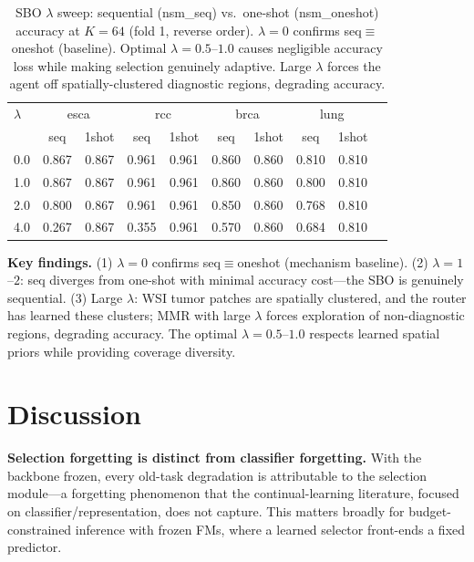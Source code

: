 \documentclass[runningheads]{llncs}
\begin{document}
\begin{table}[htbp]
\centering
\caption{SBO $\lambda$ sweep: sequential (nsm\_seq) vs.\ one-shot
(nsm\_oneshot) accuracy at $K{=}64$ (fold 1, reverse order).
$\lambda{=}0$ confirms seq$\equiv$oneshot (baseline). Optimal
$\lambda{=}0.5$--$1.0$ causes negligible accuracy loss while making
selection genuinely adaptive. Large $\lambda$ forces the agent off
spatially-clustered diagnostic regions, degrading accuracy.}
\label{tab:lambda}
\small\begin{tabular}{lccccccccc}
\toprule
$\lambda$ & \multicolumn{2}{c}{esca} & \multicolumn{2}{c}{rcc} & \multicolumn{2}{c}{brca} & \multicolumn{2}{c}{lung} \\
 & seq & 1shot & seq & 1shot & seq & 1shot & seq & 1shot \\
\midrule
0.0 & 0.867 & 0.867 & 0.961 & 0.961 & 0.860 & 0.860 & 0.810 & 0.810 \\
1.0 & 0.867 & 0.867 & 0.961 & 0.961 & 0.860 & 0.860 & 0.800 & 0.810 \\
2.0 & 0.800 & 0.867 & 0.961 & 0.961 & 0.850 & 0.860 & 0.768 & 0.810 \\
4.0 & 0.267 & 0.867 & 0.355 & 0.961 & 0.570 & 0.860 & 0.684 & 0.810 \\
\bottomrule
\end{tabular}
\end{table}

\noindent\textbf{Key findings.} (1) $\lambda{=}0$ confirms seq$\equiv$oneshot
(mechanism baseline). (2) $\lambda{=}1$--$2$: seq diverges from
one-shot with minimal accuracy cost---the SBO is genuinely
sequential. (3) Large $\lambda$: WSI tumor patches are spatially
clustered, and the router has learned these clusters; MMR with large
$\lambda$ forces exploration of non-diagnostic regions, degrading
accuracy. The optimal $\lambda{=}0.5$--$1.0$ respects learned spatial
priors while providing coverage diversity.

\FloatBarrier
\section{Discussion}
\label{sec:discussion}

\noindent\textbf{Selection forgetting is distinct from classifier forgetting.}
With the backbone frozen, every old-task degradation is attributable to
the selection module---a forgetting phenomenon that the
continual-learning literature, focused on classifier/representation,
does not capture. This matters broadly for budget-constrained inference
with frozen FMs, where a learned selector front-ends a fixed predictor.
\end{document}
